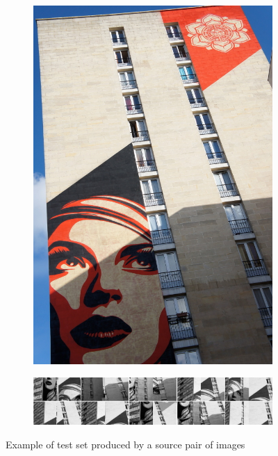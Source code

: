 \documentclass[12pt,journal]{IEEEtran}
\begin{document}
\begin{figure}
{\begin{subfigure}[t]{0.048\textwidth}
			\includegraphics[width=\textwidth]{images/pair_example2}
			\label{fig:fairey2}
		\end{subfigure}%
		\enspace %
		\begin{subfigure}[t]{0.36\textwidth}
			\centering
			\includegraphics[width=\textwidth]{images/crop_examples}
		\end{subfigure}%
	}%
	\caption{Example of test set produced by a source pair of images}
	\label{fig:fairey}
\end{figure}
\end{document}
